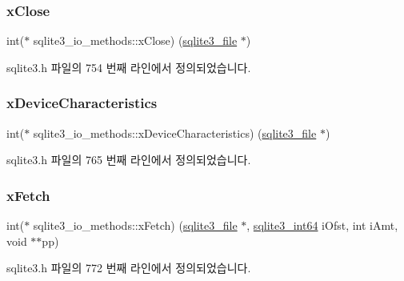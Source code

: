 \subsubsection{\texorpdfstring{x\+Close}{xClose}}
{\footnotesize\ttfamily int($\ast$ sqlite3\+\_\+io\+\_\+methods\+::x\+Close) (\hyperlink{structsqlite3__file}{sqlite3\+\_\+file} $\ast$)}



sqlite3.\+h 파일의 754 번째 라인에서 정의되었습니다.

\mbox{\label{structsqlite3__io__methods_abbf1b4769c310bfee517af815eed93e9}} 
\subsubsection{\texorpdfstring{x\+Device\+Characteristics}{xDeviceCharacteristics}}
{\footnotesize\ttfamily int($\ast$ sqlite3\+\_\+io\+\_\+methods\+::x\+Device\+Characteristics) (\hyperlink{structsqlite3__file}{sqlite3\+\_\+file} $\ast$)}



sqlite3.\+h 파일의 765 번째 라인에서 정의되었습니다.

\mbox{\label{structsqlite3__io__methods_a71e611fc755d95ffbd3e7ecb8cb5fae6}} 
\subsubsection{\texorpdfstring{x\+Fetch}{xFetch}}
{\footnotesize\ttfamily int($\ast$ sqlite3\+\_\+io\+\_\+methods\+::x\+Fetch) (\hyperlink{structsqlite3__file}{sqlite3\+\_\+file} $\ast$, \hyperlink{sqlite3_8h_a0a4d3e6c1ad46f90e746b920ab6ca0d2}{sqlite3\+\_\+int64} i\+Ofst, int i\+Amt, void $\ast$$\ast$pp)}



sqlite3.\+h 파일의 772 번째 라인에서 정의되었습니다.

\mbox{\label{structsqlite3__io__methods_a913b12deb1dcae2c61b90776bcd9d19c}} 
